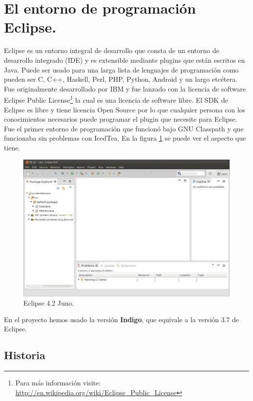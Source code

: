 \section{El entorno de programación Eclipse.}

Eclipse es un entorno integral de desarrollo que consta de un entorno de desarrollo integrado (IDE) y es extensible mediante plugins que están escritos en Java. Puede ser usado para una larga lista de lenguajes de programación como pueden ser C, C++, Haskell, Perl, PHP, Python, Android y un largo etcétera. Fue originalmente desarrollado por IBM y fue lanzado con la licencia de software Eclipse Public License\footnote{ Para más información visite: \url{http://en.wikipedia.org/wiki/Eclipse\_Public\_License}} la cual es una licencia de software libre. El SDK de Eclipse es libre y tiene licencia Open Source por lo que cualquier persona con los conocimientos necesarios puede programar el plugin que necesite para Eclipse. Fue el primer entorno de programación que funcionó bajo GNU Classpath y que funcionaba sin problemas con IcedTea. En la figura \ref{fig:pantallaEclipse} se puede ver el aspecto que tiene.

\begin{figure}
  \centering
    \includegraphics[scale=0.5]{./ConocimientosPrevios/imagenes/pantallaEclipse.png}
  \caption{Eclipse 4.2 Juno.}
  \label{fig:pantallaEclipse}
\end{figure} 

En el proyecto hemos usado la versión \textbf{Indigo}, que equivale a la versión 3.7 de Eclipse.

\subsection{Historia}

